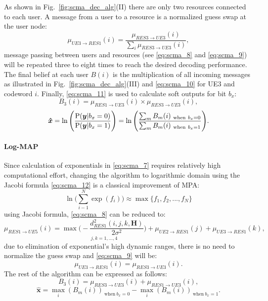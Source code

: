 As shown in Fig.~\ref{fig:scma_dec_alg}(II) there are only two resources
connected to each user. A message from a user to a resource is a normalized
guess swap at the user node:
\begin{equation}
  \label{eq:scma_9}
  \mu_{UE3 \rightarrow RES1}(i) = \frac{\mu_{RES3 \rightarrow UE3}(i)}
  {\sum_i\mu_{RES3 \rightarrow UE3}(i)},
\end{equation}
message passing between users and resources (see \eqref{eq:scma_8} and
\eqref{eq:scma_9}) will be repeated three to eight times to reach the desired
decoding performance. The final belief at each user $B(i)$ is the multiplication
of all incoming messages as illustrated in Fig.~{\ref{fig:scma_dec_alg}}(III)
and \eqref{eq:scma_10} for UE3 and codeword $i$. Finally, \eqref{eq:scma_11} is
used to calculate soft outputs for bit $b_x$:
\begin{equation}
  \label{eq:scma_10}
  B_3(i) = \mu_{RES1 \rightarrow UE3}(i) \times \mu_{RES3 \rightarrow UE3}(i),
\end{equation}
\begin{equation}
  \label{eq:scma_11}
  \bm{\hat{x}} = \ln \Bigg( \frac{\operatorname{P}(\bm{y}|b_x=0)}{\operatorname{P}(\bm{y}|b_x=1)} \Bigg) =
  \ln \Bigg( \frac{\sum_m B_m(i)_{~\text{when}~b_x=0}}{\sum_m B_m(i)_{~\text{when}~b_x=1}}
  \Bigg).
\end{equation}

\paragraph{Log-MAP}
\label{sec:scma_log-map}

Since calculation of exponentials in \eqref{eq:scma_7} requires relatively high
computational effort, changing the algorithm to logarithmic domain using the
Jacobi formula \eqref{eq:scma_12} is a classical improvement of MPA:
\begin{equation}
  \label{eq:scma_12}
  \ln \Bigg( \sum\limits_{i-1}^N\exp(f_i) \Bigg) \approx \max\{f_1,f_2,...,f_N\}
\end{equation}
using Jacobi formula, \eqref{eq:scma_8} can be reduced to:
\begin{equation}
  \label{eq:scma_13}
  \mu_{RES1 \rightarrow UE5}(i) = \underset{j,k=1,...,4}
  {\max \Bigg(-\frac{d_{RES1}^2(i,j,k,\bm{H})}{2\sigma^2} \Bigg)} +
  \mu_{UE2 \rightarrow RES1}(j) + \mu_{UE3 \rightarrow RES1}(k),
\end{equation}
due to elimination of exponential's high dynamic ranges, there is no need to
normalize the guess swap and \eqref{eq:scma_9} will be:
\begin{equation}
  \label{eq:scma_14}
  \mu_{UE3 \rightarrow RES1}(i) = \mu_{RES3 \rightarrow UE3}(i).
\end{equation}
The rest of the algorithm can be expressed as follows:
\begin{equation}
  \label{eq:scma_15}
  B_3(i) = \mu_{RES3 \rightarrow UE3}(i) + \mu_{RES1 \rightarrow UE3}(i),
\end{equation}
\begin{equation}
  \label{eq:scma_16}
  \bm{\hat{x}} = \max_i(B_m(i))_{~\text{when}~b_x=0} - \max_i(B_m(i))_{~\text{when}~b_x=1}.
\end{equation}

